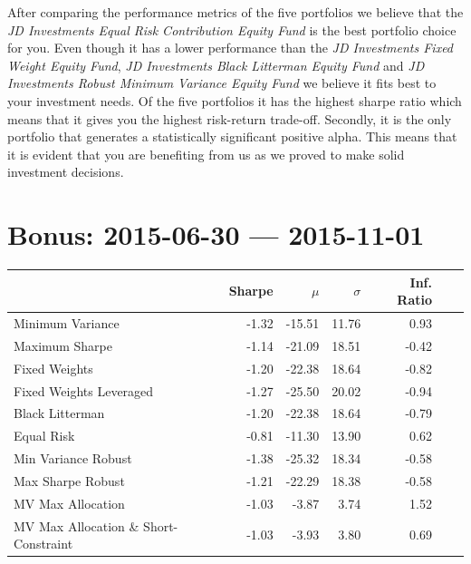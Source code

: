\documentclass[11pt, parskip=full, DIV=14]{scrreprt}
\begin{document}
After comparing the performance metrics of the five portfolios we believe that the \textit{JD Investments Equal Risk Contribution Equity Fund} is the best portfolio choice for you. Even though it has a lower performance than the \textit{JD Investments Fixed Weight Equity Fund}, \textit{JD Investments Black Litterman Equity Fund} and \textit{JD Investments Robust Minimum Variance Equity Fund} we believe it fits best to your investment needs. Of the five portfolios it has the highest sharpe ratio which means that it gives you the highest risk-return trade-off. Secondly, it is the only portfolio that generates a statistically significant positive alpha. This means that it is evident that you are benefiting from us as we proved to make solid investment decisions.

\chapter{Bonus: 2015-06-30 --- 2015-11-01}
\begin{table}[ht]
\centering
\begin{tabular}{lrrrrrr}
  \toprule
 & Sharpe & $\mu$ & $\sigma$ & Inf. Ratio\\
  \midrule
Minimum Variance & -1.32 & -15.51 & 11.76 & 0.93\\ 
  Maximum Sharpe & -1.14 & -21.09 & 18.51 & -0.42\\ 
  Fixed Weights & -1.20 & -22.38 & 18.64 & -0.82\\ 
  Fixed Weights Leveraged & -1.27 & -25.50 & 20.02 & -0.94\\ 
  Black Litterman & -1.20 & -22.38 & 18.64 & -0.79\\ 
  Equal Risk & -0.81 & -11.30 & 13.90 & 0.62\\ 
  Min Variance Robust & -1.38 & -25.32 & 18.34 & -0.58\\ 
  Max Sharpe Robust & -1.21 & -22.29 & 18.38 & -0.58\\ 
  MV Max Allocation & -1.03 & -3.87 & 3.74 & 1.52\\ 
  MV Max Allocation \& Short-Constraint & -1.03 & -3.93 & 3.80 & 0.69\\ 
   \bottomrule
\end{tabular}
\end{table}
\end{document}
